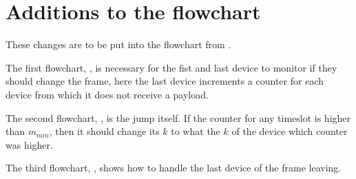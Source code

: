 \section{Additions to the flowchart}
These changes are to be put into the flowchart from .

The first flowchart, , is necessary for the fist and last device to monitor if they should change the frame, here the last device increments a counter for each device from which it does not receive a payload.


The second flowchart, , is the jump itself.
If the counter for any timeslot is higher than $m_{min}$, then it should change its $k$ to what the $k$ of the device which counter was higher.

The third flowchart, , shows how to handle the last device of the frame leaving.
